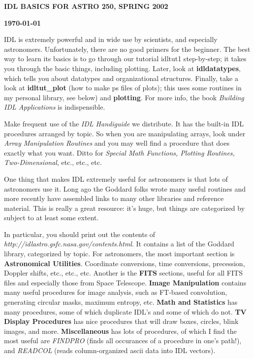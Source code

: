  

\centerline{\bf IDL BASICS FOR ASTRO 250, SPRING 2002}
\centerline{\bf \today}


	 IDL is extremely powerful and in wide use by scientists, and
especially astronomers.  Unfortunately, there are no good primers for
the beginner.  The best way to learn its basics is to go through our
tutorial idltut1 step-by-step; it takes you through the basic things,
including plotting.  Later, look at {\bf idldatatypes}, which tells you
about datatypes and organizational structures.  Finally, take a look at
{\bf idltut\_plot} (how to make ps files of plots); this uses some
routines in my personal library, see below) and {\bf plotting}.  For
more info, the book {\it Building IDL Applications} is indispensible. 


	Make frequent use of the {\it IDL Handiguide} we distribute.  It
has the built-in IDL procedures arranged by topic.  So when you are
manipulating arrays, look under {\it Array Manipulation Routines} and
you may well find a procedure that does exactly what you want.  Ditto
for {\it Special Math Functions, Plotting Routines, Two-Dimensional},
etc., etc., etc.  


	One thing that makes IDL extremely useful for astronomers is
that lots of astronomers use it.  Long ago the Goddard folks wrote many
useful routines and more recently have assembled links to many other
libraries and reference material.  This is really a great resource: it's
huge, but things are categorized by subject to at least some extent. 

	In particular, you should print out the contents of {\it
http://idlastro.gsfc.nasa.gov/contents.html}.  It contains a list of the
Goddard library, categorized by topic.  For astronomers, the most
important section is {\bf Astronomical Utilities}.  Coordinate
conversions, time conversions, precession, Doppler shifts, etc., etc.,
etc.  Another is the {\bf FITS} sections, useful for all FITS files and
especially those from Space Telescope.  {\bf Image Manipulation}
contains many useful procedures for image analysis, such as FT-based
convolution, generating circular masks, maximum entropy, etc.  {\bf Math
and Statistics} has many procedures, some of which duplicate IDL's and
some of which do not.  {\bf TV Display Procedures} has nice procedures
that will draw boxes, circles, blink images, and more.  {\bf
Miscellaneous} has lots of procedures, of which I find the most useful
are {\it FINDPRO} (finds all occurances of a procedure in one's path!),
and {\it READCOL} (reads column-organized ascii data into IDL vectors). 

